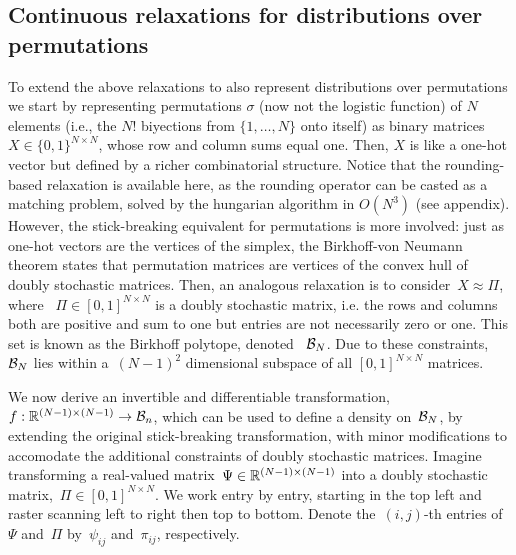 \documentclass{article}
\begin{document}
\subsection{Continuous relaxations for distributions over permutations}
\label{sub:permutation}
To extend the above relaxations to also represent distributions over permutations we start by representing permutations $\sigma$ (now not the logistic function) of $N$ elements (i.e., the $N!$ biyections from $\{1,\ldots,N\}$ onto itself) as binary matrices $X\in \{0,1\}^ {N \times N}$, whose row and column sums equal one. Then, $X$ is like a one-hot vector but defined by a richer combinatorial structure. Notice that the rounding-based relaxation is available here, as the rounding operator can be casted as a matching problem, solved by the hungarian algorithm in $O(N^3)$ (see appendix). However, the stick-breaking equivalent for permutations is more involved: just as one-hot vectors are the vertices of the simplex, the Birkhoff-von Neumann
theorem states that permutation matrices are vertices of the convex
hull of doubly stochastic matrices. Then, an analogous relaxation is to consider~$X \approx {\Pi}$,
where ~${\Pi} \in [0,1]^{N \times N}$ is a doubly stochastic matrix,
i.e. the rows and columns both are positive and sum to one but entries are not necessarily zero or one. This set is known as the Birkhoff polytope, denoted ~$\mathcal{B}_N$. Due to these constraints, ~$\mathcal{B}_N$ lies within a~$(N-1)^2$ dimensional subspace of all $[0,1]^{N \times N}$ matrices.
 

We now derive an invertible and differentiable transformation,~$f: \mathbb{R}^{(N-1) \times (N-1)} \to \mathcal{B}_n$,
which can be used to define a density on~$\mathcal{B}_N$, by extending the original stick-breaking transformation, with minor
modifications to accomodate the additional constraints of doubly stochastic
matrices. Imagine transforming a real-valued matrix~$\Psi \in \mathbb{R}^{(N-1) \times (N-1)}$
into a doubly stochastic matrix,~${\Pi} \in [0,1]^{N \times N}$.
We work entry by entry, starting in the top left
and raster scanning left to right then top to bottom. Denote the~$(i,j)$-th entries
of~$\Psi$ and~${\Pi}$ by~$\psi_{ij}$ and~${\pi}_{ij}$, respectively.
\end{document}

